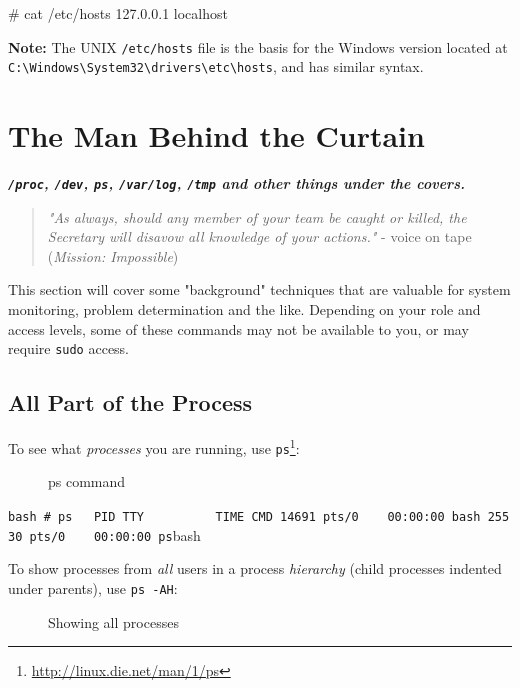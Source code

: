 \documentclass[10pt,american,]{book}
\makeatletter
\newenvironment{Shaded}{\begin{snugshade}}{\end{snugshade}}
\newcommand{\KeywordTok}[1]{\textcolor[rgb]{0.13,0.29,0.53}{\textbf{{#1}}}}
\newcommand{\CommentTok}[1]{\textcolor[rgb]{0.56,0.35,0.01}{\textit{{#1}}}}
\newcommand{\NormalTok}[1]{{#1}}
\renewcommand{\href}[2]{#2\footnote{\url{#1}}}
\numberwithin{figure}{chapter}
\DeclareRobustCommand{\drcap}[1]{\begin{figure}[H]\caption{#1}\end{figure}}
\DeclareRobustCommand{\drcmd}[1]{\index{Commands!#1@\texttt{#1}}}
\renewcommand{\KeywordTok}[1]{{#1}}
\renewcommand{\CommentTok}[1]{{#1}}
\renewcommand{\NormalTok}[1]{{#1}}
\makeatother
\begin{document}
\begin{Shaded}
\begin{Highlighting}[]
\CommentTok{# cat /etc/hosts}
\KeywordTok{127.0.0.1}       \NormalTok{localhost}
\end{Highlighting}
\end{Shaded}

\textbf{Note:} The UNIX \texttt{/etc/hosts} file is the basis for the
Windows version located at
\texttt{C:\textbackslash{}Windows\textbackslash{}System32\textbackslash{}drivers\textbackslash{}etc\textbackslash{}hosts},
and has similar syntax.

\hypertarget{the-man-behind-the-curtain}{\chapter{The Man Behind the
Curtain}\label{the-man-behind-the-curtain}}

\textbf{\emph{\texttt{/proc}, \texttt{/dev}, \texttt{ps},
\texttt{/var/log}, \texttt{/tmp} and other things under the covers.}}

\begin{quote}
\emph{"As always, should any member of your team be caught or killed,
the Secretary will disavow all knowledge of your actions."} - voice on
tape (\emph{Mission: Impossible})
\end{quote}

This section will cover some "background" techniques that are valuable
for system monitoring, problem determination and the like. Depending on
your role and access levels, some of these commands may not be available
to you, or may require \texttt{sudo} access.

\section*{All Part of the Process}\label{all-part-of-the-process}

To see what \emph{processes} you are running, use
\href{http://linux.die.net/man/1/ps}{\texttt{ps}}\drcmd{ps}:

\drcap{ps command}
\texttt{bash\ \#\ ps\ \ \ PID\ TTY\ \ \ \ \ \ \ \ \ \ TIME\ CMD\ 14691\ pts/0\ \ \ \ 00:00:00\ bash\ 25530\ pts/0\ \ \ \ 00:00:00\ ps}bash

To show processes from \emph{all} users in a process \emph{hierarchy}
(child processes indented under parents), use \texttt{ps\ -AH}:

\drcap{Showing all processes}
\end{document}
